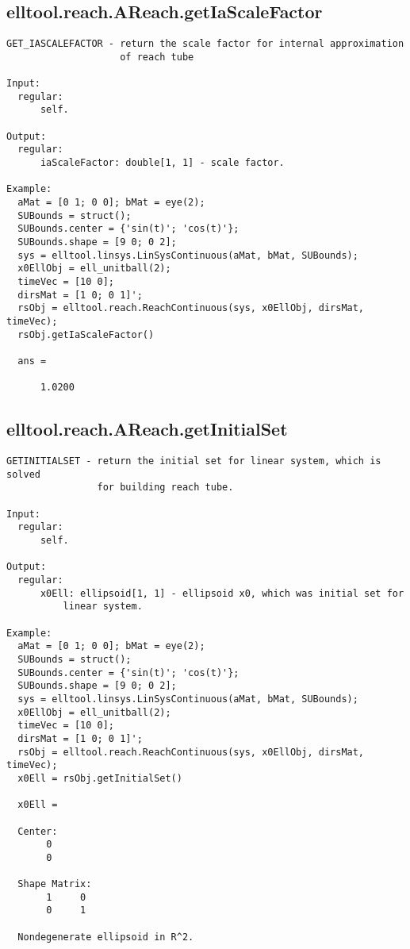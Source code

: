 \subsection{\texorpdfstring{elltool.reach.AReach.getIaScaleFactor}{getIaScaleFactor}}\label{method:elltool.reach.AReach.getIaScaleFactor}
\begin{verbatim}
GET_IASCALEFACTOR - return the scale factor for internal approximation
                    of reach tube

Input:
  regular:
      self.

Output:
  regular:
      iaScaleFactor: double[1, 1] - scale factor.

Example:
  aMat = [0 1; 0 0]; bMat = eye(2);
  SUBounds = struct();
  SUBounds.center = {'sin(t)'; 'cos(t)'};
  SUBounds.shape = [9 0; 0 2];
  sys = elltool.linsys.LinSysContinuous(aMat, bMat, SUBounds);
  x0EllObj = ell_unitball(2);
  timeVec = [10 0];
  dirsMat = [1 0; 0 1]';
  rsObj = elltool.reach.ReachContinuous(sys, x0EllObj, dirsMat, timeVec);
  rsObj.getIaScaleFactor()

  ans =

      1.0200
\end{verbatim}
\subsection{\texorpdfstring{elltool.reach.AReach.getInitialSet}{getInitialSet}}\label{method:elltool.reach.AReach.getInitialSet}
\begin{verbatim}
GETINITIALSET - return the initial set for linear system, which is solved
                for building reach tube.

Input:
  regular:
      self.

Output:
  regular:
      x0Ell: ellipsoid[1, 1] - ellipsoid x0, which was initial set for
          linear system.

Example:
  aMat = [0 1; 0 0]; bMat = eye(2);
  SUBounds = struct();
  SUBounds.center = {'sin(t)'; 'cos(t)'};
  SUBounds.shape = [9 0; 0 2];
  sys = elltool.linsys.LinSysContinuous(aMat, bMat, SUBounds);
  x0EllObj = ell_unitball(2);
  timeVec = [10 0];
  dirsMat = [1 0; 0 1]';
  rsObj = elltool.reach.ReachContinuous(sys, x0EllObj, dirsMat, timeVec);
  x0Ell = rsObj.getInitialSet()

  x0Ell =

  Center:
       0
       0

  Shape Matrix:
       1     0
       0     1

  Nondegenerate ellipsoid in R^2.
\end{verbatim}
